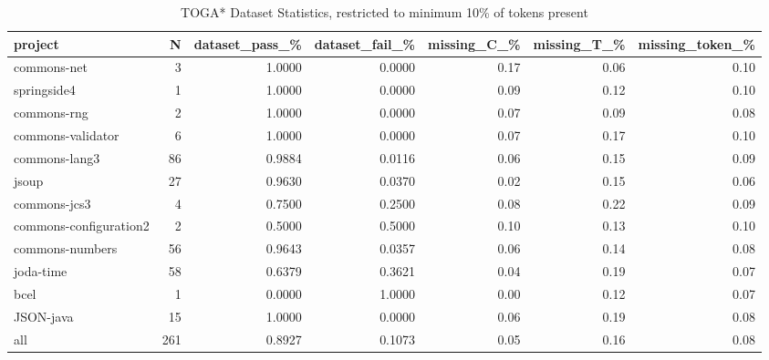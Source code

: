 \begin{table*}
\centering
\caption{TOGA* Dataset Statistics, restricted to minimum 10\% of tokens present}
\label{tab:toga_stats_10}
\begin{tabular}{lrrrrrr}
\toprule
                project &    N &  dataset\_pass\_\% &  dataset\_fail\_\% &  missing\_C\_\% &  missing\_T\_\% &  missing\_token\_\% \\
\midrule
            commons-net &    3 &          1.0000 &          0.0000 &         0.17 &         0.06 &             0.10 \\
            springside4 &    1 &          1.0000 &          0.0000 &         0.09 &         0.12 &             0.10 \\
            commons-rng &    2 &          1.0000 &          0.0000 &         0.07 &         0.09 &             0.08 \\
      commons-validator &    6 &          1.0000 &          0.0000 &         0.07 &         0.17 &             0.10 \\
          commons-lang3 &   86 &          0.9884 &          0.0116 &         0.06 &         0.15 &             0.09 \\
                  jsoup &   27 &          0.9630 &          0.0370 &         0.02 &         0.15 &             0.06 \\
           commons-jcs3 &    4 &          0.7500 &          0.2500 &         0.08 &         0.22 &             0.09 \\
 commons-configuration2 &    2 &          0.5000 &          0.5000 &         0.10 &         0.13 &             0.10 \\
        commons-numbers &   56 &          0.9643 &          0.0357 &         0.06 &         0.14 &             0.08 \\
              joda-time &   58 &          0.6379 &          0.3621 &         0.04 &         0.19 &             0.07 \\
                   bcel &    1 &          0.0000 &          1.0000 &         0.00 &         0.12 &             0.07 \\
              JSON-java &   15 &          1.0000 &          0.0000 &         0.06 &         0.19 &             0.08 \\
                    all &  261 &          0.8927 &          0.1073 &         0.05 &         0.16 &             0.08 \\
\bottomrule
\end{tabular}
\end{table*}
